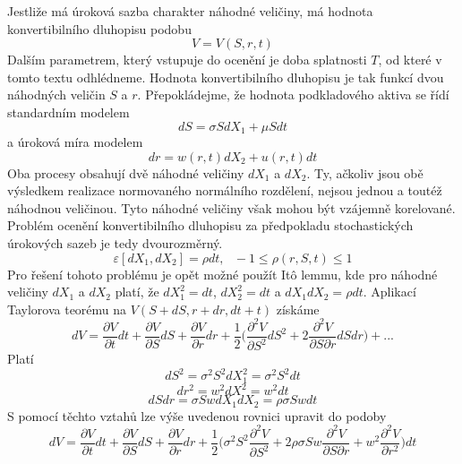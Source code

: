 \documentclass[a4paper]{book}
\begin{document}
Jestliže má úroková sazba charakter náhodné veličiny, má hodnota konvertibilního dluhopisu podobu
\begin{equation*}
V = V(S,r,t)
\end{equation*}
Dalším parametrem, který vstupuje do ocenění je doba splatnosti $T$, od které v tomto textu odhlédneme. Hodnota konvertibilního dluhopisu je tak funkcí dvou náhodných veličin $S$ a $r$. Přepokládejme, že hodnota podkladového aktiva se řídí standardním modelem
\begin{equation}
dS = \sigma S dX_1 + \mu S dt
\end{equation}
a úroková míra modelem
\begin{equation}
dr = w(r,t)dX_2 + u(r,t)dt
\end{equation}
Oba procesy obsahují dvě náhodné veličiny $dX_1$ a $dX_2$. Ty, ačkoliv jsou obě výsledkem realizace normovaného normálního rozdělení, nejsou jednou a toutéž náhodnou veličinou. Tyto náhodné veličiny však mohou být vzájemně korelované. Problém ocenění konvertibilního dluhopisu za předpokladu stochastických úrokových sazeb je tedy dvourozměrný.
\begin{equation*}
\varepsilon[dX_1, dX_2] = \rho dt, ~~~ -1 \le \rho(r, S, t) \le 1
\end{equation*}
Pro řešení tohoto problému je opět možné použít It\^o lemmu, kde pro náhodné veličiny $dX_1$ a $dX_2$ platí, že $dX_1^2 = dt$, $dX_2^2 = dt$ a $dX_1 dX_2 = \rho dt$. Aplikací Taylorova teorému na $V(S + dS, r + dr, dt + t)$ získáme
\begin{equation*}
dV = \frac{\partial V}{\partial t} dt + \frac{\partial V}{\partial S}dS + \frac{\partial V}{\partial r}dr + \frac{1}{2}\Bigg( \frac{\partial^2 V}{\partial S^2}dS^2 + 2\frac{\partial^2 V}{\partial S \partial r}dS dr \Bigg) + ...
\end{equation*}
Platí
\begin{equation*}
dS^2 = \sigma^2 S^2 dX_1^2 = \sigma^2 S^2 dt
\end{equation*}
\begin{equation*}
dr^2 = w^2 dX^2 = w^2 dt
\end{equation*}
\begin{equation*}
dSdr = \sigma S w d X_1 dX_2 = \rho \sigma S w dt
\end{equation*}
S pomocí těchto vztahů lze výše uvedenou rovnici upravit do podoby
\begin{equation}
dV = \frac{\partial V}{\partial t}dt + \frac{\partial V}{\partial S}dS + \frac{\partial V}{\partial r}dr + \frac{1}{2}\Bigg( \sigma^2 S^2 \frac{\partial^2 V}{\partial S^2} + 2 \rho \sigma S w \frac{\partial^2 V}{\partial S \partial r} + w^2 \frac{\partial^2 V}{\partial r^2} \Bigg) dt
\end{equation}
\end{document}
